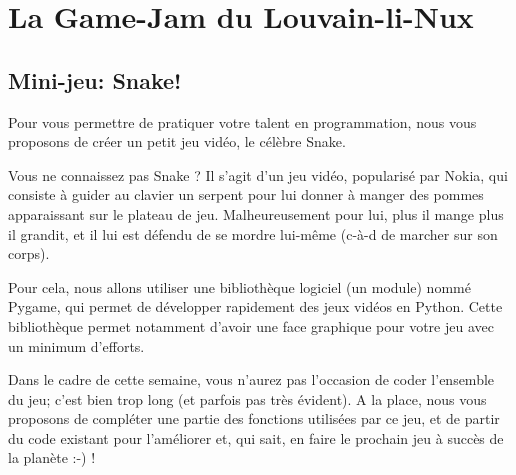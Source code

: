 \documentclass[12pt,a4paper,oneside]{report}
\begin{document}
\chapter{La Game-Jam du Louvain-li-Nux}
\section{Mini-jeu: Snake!}

Pour vous permettre de pratiquer votre talent en programmation, nous vous proposons de créer un petit jeu vidéo, le célèbre Snake.

Vous ne connaissez pas Snake ? Il s'agit d'un jeu vidéo, popularisé par Nokia, qui consiste à guider au clavier un serpent pour lui donner à manger des pommes apparaissant sur le plateau de jeu. Malheureusement pour lui, plus il mange plus il grandit, et il lui est défendu de se mordre lui-même (c-à-d de marcher sur son corps).

Pour cela, nous allons utiliser une bibliothèque logiciel (un module) nommé Pygame, qui permet de développer rapidement des jeux vidéos en Python. Cette bibliothèque permet notamment d'avoir une face graphique pour votre jeu avec un minimum d'efforts.

Dans le cadre de cette semaine, vous n'aurez pas l'occasion de coder l'ensemble du jeu; c'est bien trop long (et parfois pas très évident). A la place, nous vous proposons de compléter une partie des fonctions utilisées par ce jeu, et de partir du code existant pour l'améliorer et, qui sait, en faire le prochain jeu à succès de la planète :-) !
\end{document}
